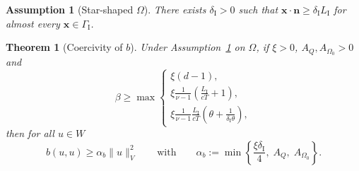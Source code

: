 \documentclass[10pt,a4paper]{amsart}
\newtheorem{assumption}{Assumption}
\newtheorem{theorem}{Theorem}
\newcommand{\GI}{{\Gamma_{\mathrm I}}}
\newcommand{\LI}{L_{\mathrm I}}
\newcommand{\OZ}{{\Omega_0}}
\newcommand{\deltaI}{{\delta_{\mathrm I}}}
\newcommand{\vect}[1]{\bm{#1}}
\begin{document}
\begin{assumption}[Star-shaped $\Omega$]\label{ass:StarS}
	There exists $\deltaI > 0 $ such that $\vect{x}\cdot\vect{n} \geq \deltaI \LI$ for almost every $\vect x\in \GI$.
\end{assumption}

\begin{theorem}[Coercivity of $b$]\label{thm:coerc_b}
	Under Assumption~\ref{ass:StarS} on $\Omega$, if $\xi > 0$, $A_Q, A_\OZ > 0$ and
	\begin{equation}
		\label{eq:coefficient_coercivity_cond}
		\beta \geq \max
		\begin{cases}
			\xi(d-1),                                               \\
			\xi\frac{1}{\nu - 1}\left(\frac{\LI}{cT}+ 1\right), \\
			\xi\frac{1}{\nu - 1}\frac{\LI}{cT}\left(\theta + \frac1{\deltaI \theta}\right),
		\end{cases}
	\end{equation}
	then for all $u \in W$
	\begin{equation} \label{eq:coercivity_condition}
		b(u,u) \geq {\alpha_b} \|u\|_V^2
		\qquad \text{with}\qquad
		\alpha_b := \min \left\{\frac{\xi\deltaI}{4}, \; A_Q, \; A_\OZ\right\}.
	\end{equation}
\end{theorem}
\end{document}
